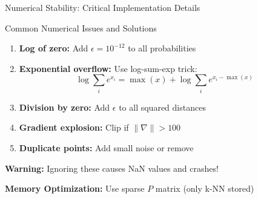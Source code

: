 \documentclass[aspectratio=169]{beamer}
\newcommand{\warning}[1]{\colorbox{red!10}{\textcolor{warningcolor}{\textbf{Warning:} #1}}}
\begin{document}
\begin{frame}{Numerical Stability: Critical Implementation Details}
\begin{block}{Common Numerical Issues and Solutions}
\begin{enumerate}
\item \textbf{Log of zero:} Add $\epsilon = 10^{-12}$ to all probabilities
\item \textbf{Exponential overflow:} Use log-sum-exp trick:
$$\log\sum_i e^{x_i} = \max(x) + \log\sum_i e^{x_i - \max(x)}$$
\item \textbf{Division by zero:} Add $\epsilon$ to all squared distances
\item \textbf{Gradient explosion:} Clip if $\|\nabla\| > 100$
\item \textbf{Duplicate points:} Add small noise or remove
\end{enumerate}
\end{block}

\warning{Ignoring these causes NaN values and crashes!}

\textbf{Memory Optimization:} Use sparse $P$ matrix (only k-NN stored)
\end{frame}
\end{document}

